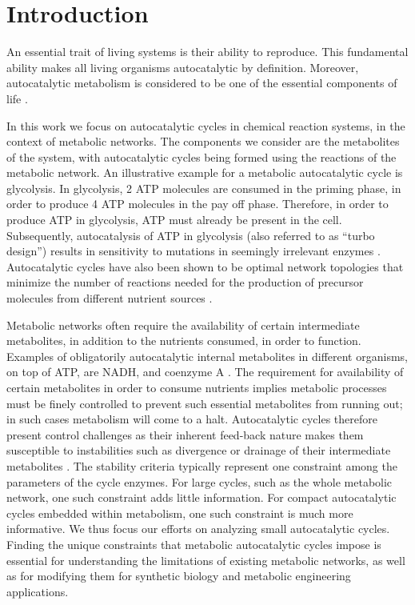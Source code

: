 \section{Introduction}
    An essential trait of living systems is their ability to reproduce.
    This fundamental ability makes all living organisms autocatalytic by definition.
    Moreover, autocatalytic metabolism is considered to be one of the essential components of life \cite{Ganti2003-ch}.

    In this work we focus on autocatalytic cycles in chemical reaction systems, in the context of metabolic networks.
    The components we consider are the metabolites of the system, with autocatalytic cycles being formed using the reactions of the metabolic network.
    An illustrative example for a metabolic autocatalytic cycle is glycolysis.
    In glycolysis, 2 ATP molecules are consumed in the priming phase, in order to produce 4 ATP molecules in the pay off phase.
    Therefore, in order to produce ATP in glycolysis, ATP must already be present in the cell.
    Subsequently, autocatalysis of ATP in glycolysis (also referred to as ``turbo design'') results in sensitivity to mutations in seemingly irrelevant enzymes \cite{Teusink1998-he}.
    Autocatalytic cycles have also been shown to be optimal network topologies that minimize the number of reactions needed for the production of precursor molecules from different nutrient sources \cite{Riehl2010-yh}.

    Metabolic networks often require the availability of certain intermediate metabolites, in addition to the nutrients consumed, in order to function.
    Examples of obligatorily autocatalytic internal metabolites in different organisms, on top of ATP, are NADH, and coenzyme A \cite{Kun2008-xg}.
    The requirement for availability of certain metabolites in order to consume nutrients implies metabolic processes must be finely controlled to prevent such essential metabolites from running out; in such cases metabolism will come to a halt.
    Autocatalytic cycles therefore present control challenges as their inherent feed-back nature makes them susceptible to instabilities such as divergence or drainage of their intermediate metabolites \cite{Teusink1998-he,Fell1999,Reznik2010-te}.
    The stability criteria typically represent one constraint among the parameters of the cycle enzymes.
    For large cycles, such as the whole metabolic network, one such constraint adds little information.
    For compact autocatalytic cycles embedded within metabolism, one such constraint is much more informative.
    We thus focus our efforts on analyzing small autocatalytic cycles.
    Finding the unique constraints that metabolic autocatalytic cycles impose is essential for understanding the limitations of existing metabolic networks, as well as for modifying them for synthetic biology and metabolic engineering applications.

